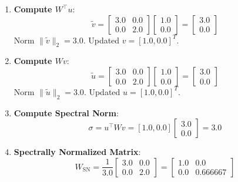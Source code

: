 \documentclass[11pt,a4paper]{article}
\theoremstyle{definition}
\begin{document}
\begin{enumerate}
    \item \textbf{Compute $W^\top u$}:
    \begin{equation}
    \tilde{v} = \begin{bmatrix} 3.0 & 0.0 \\ 0.0 & 2.0 \end{bmatrix} \begin{bmatrix} 1.0 \\ 0.0 \end{bmatrix} = \begin{bmatrix} 3.0 \\ 0.0 \end{bmatrix}
    \end{equation}
    Norm $\|\tilde{v}\|_2 = 3.0$. Updated $v = [1.0, 0.0]^T$.
    \item \textbf{Compute $W v$}:
    \begin{equation}
    \tilde{u} = \begin{bmatrix} 3.0 & 0.0 \\ 0.0 & 2.0 \end{bmatrix} \begin{bmatrix} 1.0 \\ 0.0 \end{bmatrix} = \begin{bmatrix} 3.0 \\ 0.0 \end{bmatrix}
    \end{equation}
    Norm $\|\tilde{u}\|_2 = 3.0$. Updated $u = [1.0, 0.0]^T$.
    \item \textbf{Compute Spectral Norm}:
    \begin{equation}
    \sigma = u^\top W v = [1.0, 0.0] \begin{bmatrix} 3.0 \\ 0.0 \end{bmatrix} = 3.0
    \end{equation}
    \item \textbf{Spectrally Normalized Matrix}:
    \begin{equation}
    W_{\text{SN}} = \frac{1}{3.0} \begin{bmatrix} 3.0 & 0.0 \\ 0.0 & 2.0 \end{bmatrix} = \begin{bmatrix} 1.0 & 0.0 \\ 0.0 & 0.666667 \end{bmatrix}
    \end{equation}
\end{enumerate}
\end{document}

